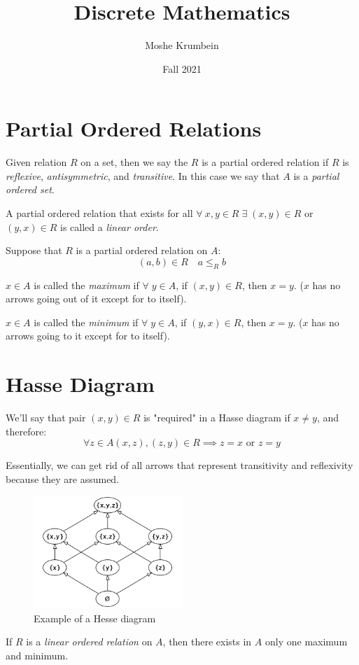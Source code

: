 \documentclass[00_complete]{subfiles}
\title{Discrete Mathematics}
\author{Moshe Krumbein}
\date{Fall 2021}
\begin{document}

\section{Partial Ordered Relations}

Given relation \(R\) on a set, then we say the \(R\) is a partial ordered
relation if \(R\) is \emph{reflexive}, \emph{antisymmetric}, and
\emph{transitive}. In this case we say that \(A\) is a \emph{partial ordered
set}.

\begin{definition}
A partial ordered relation that exists for all
\(\forall \: x,y \in R \;\exists\; (x,y) \in R\) or \((y,x) \in R\) is
called a \emph{linear order}.
\end{definition}

Suppose that \(R\) is a partial ordered relation on \(A\):
\[(a,b) \in R \quad a \leq_R b\]

\(x \in A\) is called the \emph{maximum} if \(\forall \; y \in A\), if
\((x,y) \in R\), then \(x=y\). (\(x\) has no arrows going out of it
except for to itself).

\(x \in A\) is called the \emph{minimum} if \(\forall \; y \in A\), if
\((y,x) \in R\), then \(x=y\). (\(x\) has no arrows going to it except
for to itself).

\section{Hasse Diagram}

We'll say that pair \((x,y) \in R\) is "required" in a Hasse diagram
if \(x \neq y\), and therefore:
\[\forall z \in A (x,z),(z,y) \in R \implies z=x \text{ or } z=y\]

Essentially, we can get rid of all arrows that represent transitivity and
reflexivity because they are assumed.

\begin{figure}[ht!]
    \centering
    \includegraphics[width=0.5\textwidth]{w4-hesse}
    \caption{Example of a Hesse diagram}
\end{figure}

\begin{claim}
If \(R\) is a \emph{linear ordered relation} on \(A\), then there exists in
\(A\) only one maximum and minimum.
\end{claim}
\end{document}
